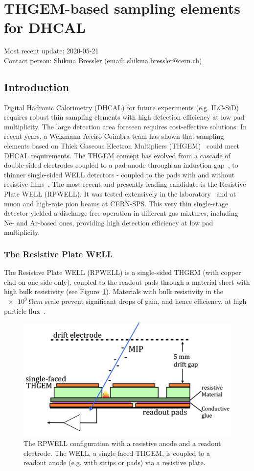 \section{THGEM-based sampling elements for DHCAL}
Most recent update: 2020-05-21 \\
Contact person: Shikma Bressler (email: shikma.bressler@cern.ch)
\subsection{Introduction}
Digital Hadronic Calorimetry (DHCAL) for future experiments (e.g. ILC-SiD) requires robust thin sampling elements with high detection efficiency at low pad multiplicity. The large detection area foreseen requires cost-effective solutions.
In recent years, a Weizmann-Aveiro-Coimbra team has shown that sampling elements based on Thick Gaseous Electron Multipliers (THGEM)~\cite{Chechik2004303} could meet DHCAL requirements. The THGEM concept has evolved from a cascade of double-sided electrodes coupled to a pad-anode through an induction gap~\cite{1748-0221-7-05-C05011}, to thinner single-sided WELL detectors - coupled to the pads with and without resistive films~\cite{1748-0221-9-04-P04011,1748-0221-8-07-P07017}.
The most recent and presently leading candidate is the Resistive Plate WELL (RPWELL). It was tested extensively in the laboratory~\cite{1748-0221-8-11-P11004,1748-0221-8-12-C12012} and at muon and high-rate pion beams at CERN-SPS. This very thin single-stage detector yielded a discharge-free operation in different gas mixtures, including Ne- and Ar-based ones, providing high detection efficiency at low pad multiplicity.

\subsubsection{The Resistive Plate WELL}
The Resistive Plate WELL (RPWELL) is a single-sided THGEM (with copper clad on one side only), coupled to the readout pads through a material sheet with high bulk resistivity (see Figure~\ref{fig:Calorimeter:THGEM:rpwell}). Materials with bulk resistivity in the $\SI{e9}{\ohm cm}$ scale prevent significant drops of gain, and hence efficiency, at high particle flux~\cite{1748-0221-8-11-P11004}.
\begin{figure}
	\centering
	\includegraphics[width=.5\textwidth]{Calorimeter/THGEM/rpwell.png}
	\caption{The RPWELL configuration with a resistive anode and a readout electrode. The WELL, a single-faced THGEM, is coupled to a readout anode (e.g. with strips or pads) via a resistive plate.}
	\label{fig:Calorimeter:THGEM:rpwell}
\end{figure}
